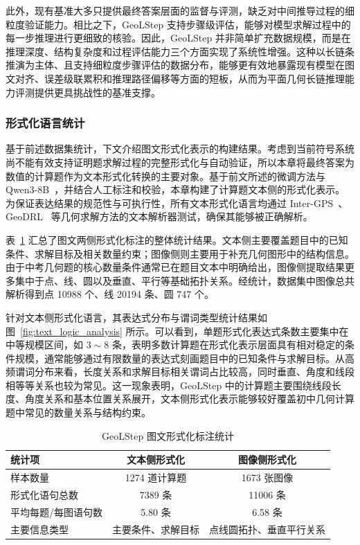 此外，现有基准大多只提供最终答案层面的监督与评测，缺乏对中间推导过程的细粒度验证能力。相比之下，GeoLStep 支持步骤级评估，能够对模型求解过程中的每一步推理进行更细致的核验。因此，GeoLStep 并非简单扩充数据规模，而是在推理深度、结构复杂度和过程评估能力三个方面实现了系统性增强。这种以长链条推演为主体、且支持细粒度步骤评估的数据分布，能够更有效地暴露现有模型在图文对齐、误差级联累积和推理路径偏移等方面的短板，从而为平面几何长链推理能力评测提供更具挑战性的基准支撑。

\subsubsection{形式化语言统计}
基于前述数据集统计，下文介绍图文形式化表示的构建结果。考虑到当前符号系统尚不能有效支持证明题求解过程的完整形式化与自动验证，所以本章将最终答案为数值的计算题作为文本形式化转换的主要对象。基于前文所述的微调方法与 Qwen3-8B~\cite{yang2025qwen3}，并结合人工标注和校验，本章构建了计算题文本侧的形式化表示。为保证表达结果的规范性与可执行性，所有文本形式化语言均通过 Inter-GPS~\cite{lu2021intergps}、GeoDRL~\cite{peng2023geodrl} 等几何求解方法的文本解析器测试，确保其能够被正确解析。

表~\ref{tab:formalization_statistics} 汇总了图文两侧形式化标注的整体统计结果。文本侧主要覆盖题目中的已知条件、求解目标及相关数量约束；图像侧则主要用于补充几何图形中的结构信息。由于中考几何题的核心数量条件通常已在题目文本中明确给出，图像侧提取结果更多集中于点、线、圆以及垂直、平行等基础拓扑关系。经统计，数据集中图像总共解析得到点 10988 个、线 20194 条、圆 747 个。

针对文本侧形式化语言，其表达式分布与谓词类型统计结果如图~\ref{fig:text_logic_analysis} 所示。可以看到，单题形式化表达式条数主要集中在中等规模区间，如 $3\sim8$ 条，表明多数计算题在形式化表示层面具有相对稳定的条件规模，通常能够通过有限数量的表达式刻画题目中的已知条件与求解目标。从高频谓词分布来看，长度关系和求解目标相关谓词占比较高，同时垂直、角度和线段相等等关系也较为常见。这一现象表明，GeoLStep 中的计算题主要围绕线段长度、角度关系和基本位置关系展开，文本侧形式化表示能够较好覆盖初中几何计算题中常见的数量关系与结构约束。

\begin{table}[htbp]
  \centering
  \caption{GeoLStep 图文形式化标注统计}
  \label{tab:formalization_statistics}
  \small
  \begin{tabular*}{\textwidth}{@{\extracolsep{\fill}}lcc}
    \toprule
    统计项 & 文本侧形式化 & 图像侧形式化 \\
    \midrule
    样本数量 & 1274 道计算题 & 1673 张图像 \\
    形式化语句总数 & 7389 条 & 11006 条 \\
    平均每题/每图语句数 & 5.80 条 & 6.58 条 \\
    主要信息类型 & 主要条件、求解目标 & 点线圆拓扑、垂直平行关系 \\
    \bottomrule
  \end{tabular*}
\end{table}

